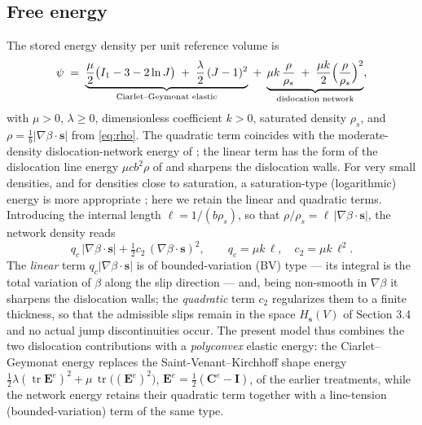 \documentclass[12pt]{article}
\theoremstyle{plain}
\theoremstyle{definition}
\newcommand{\bC}{\bm{C}}
\newcommand{\bE}{\bm{E}}
\newcommand{\bs}{\bm{s}}
\newcommand{\bI}{\bm{I}}
\newcommand{\Ce}{\bC^{e}}
\newcommand{\tr}{\operatorname{tr}}
\begin{document}
\subsection{Free energy}\label{sec:energy}
The stored energy density per unit reference volume is
\begin{equation}\label{eq:psi}
  \psi \;=\; \underbrace{\frac{\mu}{2}\bigl(I_1-3-2\ln J\bigr)
  \;+\; \frac{\lambda}{2}\,(J-1)^2}_{\text{Ciarlet--Geymonat elastic}}
  \;+\; \underbrace{\mu k\,\frac{\rho}{\rho_s}
  \;+\; \frac{\mu k}{2}\Bigl(\frac{\rho}{\rho_s}\Bigr)^{2}}_{\text{dislocation network}} ,
\end{equation}
with $\mu>0$, $\lambda\ge0$, dimensionless coefficient $k>0$, saturated density
$\rho_s$, and $\rho=\tfrac1b|\nabla\beta\cdot\bs|$ from \eqref{eq:rho}. The
quadratic term coincides with the moderate-density dislocation-network energy of
\citet[Eq.~(1)]{koster2015bformation}; the linear term has the form of the dislocation line energy $\mu c b^{2}\rho$ of \citet[Eq.~(25)]{koster2015aformation} and sharpens the dislocation walls. For very small densities, and for densities close to
saturation, a saturation-type (logarithmic) energy is more appropriate
\citep{berdichevsky2006thermodynamics}; here we retain the
linear and quadratic terms. Introducing the internal length
$\ell=1/(b\rho_s)$, so that $\rho/\rho_s=\ell\,|\nabla\beta\cdot\bs|$, the network
density reads
\begin{equation}\label{eq:disl-moduli}
  q_c\,\bigl|\nabla\beta\cdot\bs\bigr|
  +\tfrac12 c_2\,(\nabla\beta\cdot\bs)^2 ,
  \qquad q_c=\mu k\,\ell,\quad c_2=\mu k\,\ell^{2}.
\end{equation}
The \emph{linear} term $q_c|\nabla\beta\cdot\bs|$ is of bounded-variation (BV) type --- its integral is the total variation of $\beta $ along the slip direction --- and, being non-smooth in $\nabla \beta $ it sharpens the dislocation walls; the \emph{quadratic} term $c_2$ regularizes them to a finite thickness, so that the admissible slips remain in the space $H_{\bs}(V)$ of Section 3.4 and no actual jump discontinuities occur. The present model thus combines the two dislocation contributions with a \emph{polyconvex} elastic energy: the Ciarlet--Geymonat energy replaces the Saint-Venant--Kirchhoff shape energy
$\tfrac12\lambda(\tr\bE^{e})^{2}+\mu\,\tr\bigl((\bE^{e})^{2}\bigr)$,
$\bE^{e}=\tfrac12(\Ce-\bI)$, of the earlier treatments, while the network energy
retains their quadratic term together with a line-tension
(bounded-variation) term of the same type.
\end{document}
